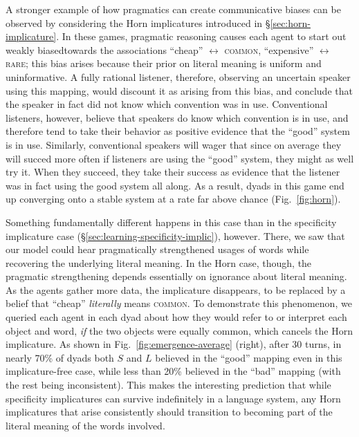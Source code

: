 \documentclass{article} %
\begin{document}
A stronger example of how pragmatics can create communicative biases can be
observed by considering the Horn implicatures introduced in \S\ref{sec:horn-implicature}. 
In these games, pragmatic reasoning causes each agent to start out weakly biasedtowards the associations ``cheap'' $\leftrightarrow$
\textsc{common}, ``expensive'' $\leftrightarrow$ \textsc{rare}; this bias arises because their prior on literal meaning
is uniform and uninformative. A fully rational listener, therefore,
observing an uncertain speaker using this mapping, would discount it
as arising from this bias, and conclude that the speaker in fact did
not know which convention was in use. Conventional listeners,
however, believe that speakers do know which convention is in
use, and therefore tend to take their behavior as positive evidence that the
``good'' system is in use. Similarly, conventional speakers
will wager that since on average they will succed more often if
listeners are using the ``good'' system, they might as well try
it. When they succeed, they take their success as evidence that the listener was in
fact using the good system all along. As a result, dyads in this game
 end up converging onto a stable system at a rate far above
chance (Fig.~\ref{fig:horn}). 

Something
fundamentally different happens in this case than in the specificity
implicature case (\S\ref{sec:learning-specificity-implic}), however. There, we
saw that our model could hear pragmatically strengthened usages
of words while recovering the underlying literal meaning. In the Horn
case, though, the pragmatic strengthening depends essentially on
ignorance about literal meaning. As the agents gather more data,
the implicature disappears, to be replaced by a belief that
``cheap'' \textit{literally} means \textsc{common}. To demonstrate
this phenomenon, we queried each agent in each dyad about how they would refer to
or interpret each object and word, \textit{if} the two objects were
equally common, which cancels the Horn implicature. As shown in
Fig.~\ref{fig:emergence-average} (right), after 30 turns, in nearly 70\%
of dyads both $S$ and $L$ believed in the ``good'' mapping even in
this implicature-free case, while less than 20\% believed in the
``bad'' mapping (with the rest being inconsistent). This makes the
interesting prediction that while specificity implicatures can survive
indefinitely in a language system, any Horn implicatures that arise
consistently should transition to becoming part of the literal meaning
of the words involved.
\end{document}
